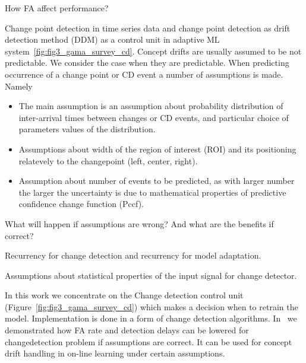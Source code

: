 How FA affect performance?

Change point detection in time series data and change point detection as drift detection method (DDM) as a control unit in adaptive ML system~\ref{fig:fig3_gama_survey_cd}.
Concept drifts are usually assumed to be not predictable.
We consider the case when they are predictable.
When predicting occurrence of a change point or CD event a number of assumptions is made.
Namely
\begin{itemize}
  \item The main assumption is an assumption about probability distribution of inter-arrival times between changes or CD events, and particular choice of parameters values of the distribution. 
  \item Assumptions about width of the region of interest (ROI) and its positioning relatevely to the changepoint (left, center, right).
  \item Assumption about number of events to be predicted, as with larger number the larger the uncertainty is due to mathematical properties of predictive confidence change function (Pccf).
\end{itemize}
What will happen if assumptions are wrong? And what are the benefits if correct?

Recurrency for change detection and recurrency for model adaptation.

Assumptions about statistical properties of the input signal for change detector. 

In this work we concentrate on the Change detection control unit (Figure~\ref{fig:fig3_gama_survey_cd}) which makes a decision when to retrain the model.
Implementation is done in a form of change detection algorithms.
In~\cite{XXX} we demonstrated how FA rate and detection delays can be lowered for changedetection problem if assumptions are correct.
It can be used for concept drift handling in on-line learning under certain assumptions.

